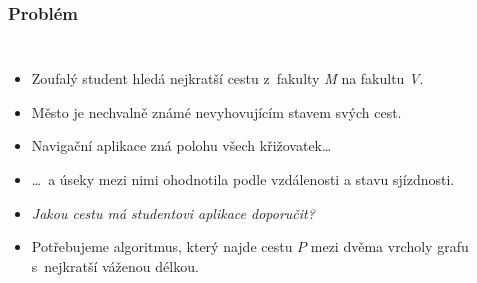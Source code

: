 \documentclass[10pt,xcolor=pdflatex,hyperref={unicode,hidelinks}]{beamer}
\begin{document}
\begin{frame}[t]\frametitle{Problém}
    \begin{columns}[T,onlytextwidth]
    \column{\dimexpr\linewidth-29mm-5mm}
    \begin{itemize}
        \item<1-> Zoufalý student hledá nejkratší cestu z~fakulty \emph{M} na fakultu \emph{V}.
        \item<2-> Město je nechvalně známé nevyhovujícím stavem svých cest.
        \item<3-> Navigační aplikace zná polohu všech křižovatek\ldots
        \item<4-> \ldots\ a úseky mezi nimi ohodnotila podle vzdálenosti a stavu sjízdnosti.
        \item<5-> \emph{Jakou cestu má studentovi aplikace doporučit?}
        \item<6-> Potřebujeme algoritmus, který najde cestu $P$ mezi dvěma vrcholy grafu s~nejkratší váženou délkou.
    \end{itemize}
    

\end{columns}
\end{frame}
\end{document}
